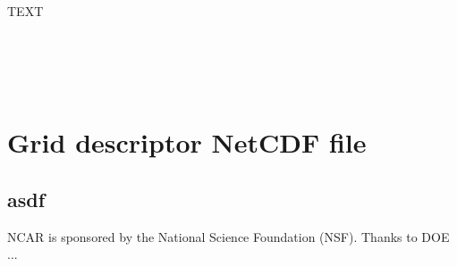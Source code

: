 \documentclass[gmd]{copernicus}
\begin{document}
\conclusions  %
TEXT




\appendix
\section{\\ \\ \hspace*{-7mm} Grid descriptor NetCDF file}    %

\subsection{asdf}                               %




\begin{acknowledgements}
NCAR is sponsored by the National Science Foundation (NSF). Thanks to DOE ...
\end{acknowledgements}






%
%
%
%











\end{document}
